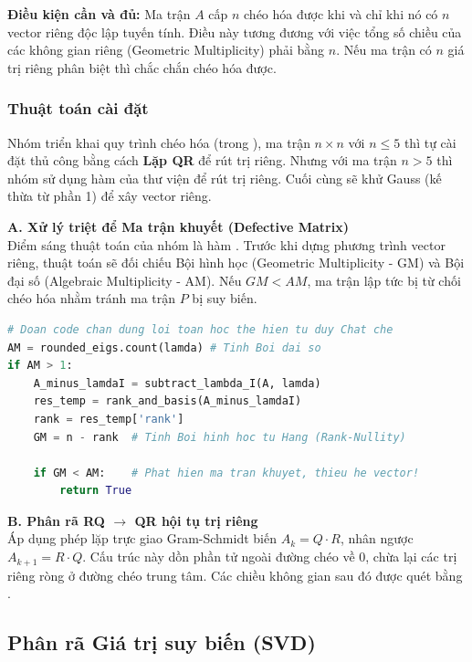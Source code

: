 \documentclass[a4paper]{article}
\begin{document}
\textbf{Điều kiện cần và đủ:} Ma trận $A$ cấp $n$ chéo hóa được khi và chỉ khi nó có $n$ vector riêng độc lập tuyến tính. Điều này tương đương với việc tổng số chiều của các không gian riêng (Geometric Multiplicity) phải bằng $n$. Nếu ma trận có $n$ giá trị riêng phân biệt thì chắc chắn chéo hóa được.

\subsubsection{Thuật toán cài đặt}
Nhóm triển khai quy trình chéo hóa (trong ), ma trận \(n \times n\) với \(n \le 5\) thì tự cài đặt thủ công bằng cách \textbf{Lặp QR} để rút trị riêng. Nhưng với ma trận \(n > 5\) thì nhóm sử dụng hàm  của thư viện  để rút trị riêng. Cuối cùng sẽ khử Gauss (kế thừa từ phần 1) để xây vector riêng.

\textbf{A. Xử lý triệt để Ma trận khuyết (Defective Matrix)}\\
Điểm sáng thuật toán của nhóm là hàm . Trước khi dựng phương trình vector riêng, thuật toán sẽ đối chiếu Bội hình học (Geometric Multiplicity - GM) và Bội đại số (Algebraic Multiplicity - AM). Nếu $GM < AM$, ma trận lập tức bị từ chối chéo hóa nhằm tránh ma trận $P$ bị suy biến.
\begin{lstlisting}[language=Python, style=pythonstyle]
# Doan code chan dung loi toan hoc the hien tu duy Chat che
AM = rounded_eigs.count(lamda) # Tinh Boi dai so
if AM > 1:
    A_minus_lamdaI = subtract_lambda_I(A, lamda)
    res_temp = rank_and_basis(A_minus_lamdaI)
    rank = res_temp['rank']
    GM = n - rank  # Tinh Boi hinh hoc tu Hang (Rank-Nullity)
    
    if GM < AM:    # Phat hien ma tran khuyet, thieu he vector!
        return True
\end{lstlisting}

\textbf{B. Phân rã RQ $\rightarrow$ QR hội tụ trị riêng}\\
Áp dụng phép lặp trực giao Gram-Schmidt biến $A_k = Q \cdot R$, nhân ngược $A_{k+1} = R \cdot Q$. Cấu trúc này dồn phần tử ngoài đường chéo về 0, chừa lại các trị riêng ròng ở đường chéo trung tâm. Các chiều không gian sau đó được quét bằng .
\subsection{Phân rã Giá trị suy biến (SVD)}
\end{document}
